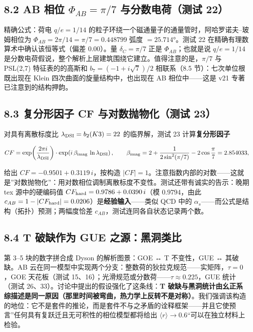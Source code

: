 \documentclass[
]{article}
\begin{document}
\subsection{\texorpdfstring{8.2 AB 相位 \(\Phi_{AB} = \pi/7\)
与分数电荷（测试
22）}{8.2 AB 相位 \textbackslash Phi\_\{AB\} = \textbackslash pi/7 与分数电荷（测试 22）}}\label{ab-ux76f8ux4f4d-phi_ab-pi7-ux4e0eux5206ux6570ux7535ux8377ux6d4bux8bd5-22}

精确公式：荷电 \(q/e = 1/14\)
的粒子环绕一个磁通量子的通量管时，阿哈罗诺夫--玻姆相位为
\(\Phi_{AB} = 2\pi/14 = \pi/7 = 0.448799\) 弧度 \(= 25.714°\)。测试 22
在精确有理数算术中确认该恒等式（偏差 \(0.00\)）。量 \(\delta_C=\pi/7\)
正是 \(\Phi_{AB}\)；也就是说 \(q/e=1/14\)
是分数电荷假说，整个解析上层建筑围绕它建立。值得注意的是，\(\pi/7\) 与
PSL(2,7) 特征表的的高斯和 \(b_7=(-1+i\sqrt7)/2\) 相联系（8.5
节）：七次单位根既出现在 Klein 四次曲面的旋量结构中，也出现在 AB
相位中------这是 v21 专著已注意到的结构押韵。

\subsection{8.3 复分形因子 CF 与对数抛物化（测试
23）}\label{ux590dux5206ux5f62ux56e0ux5b50-cf-ux4e0eux5bf9ux6570ux629bux7269ux5316ux6d4bux8bd5-23}

对具有离散标度比 \(\lambda_{\rm DSI} = b_2(K3) = 22\) 的临界解，测试 23
计算\textbf{复分形因子}

\[CF = \exp\!\left(\frac{2\pi i}{\lambda_{\rm DSI}}\right)\cdot\exp\!\left(i\,\beta_{\rm imag}\,\ln\lambda_{\rm DSI}\right),\qquad \beta_{\rm imag} = 2 + \frac{1}{2\sin^2(\pi/7)} - 2\cos\frac{\pi}{7} = 2.854033,\]

给出 \(CF = -0.9501 + 0.3119\,i\)，按构造
\(|CF| = 1\)。注意指数内部的对数------这就是''对数抛物化''：用对数相位调制离散标度不变性。测试还带有诚实的告示：晚期
tex 源中的硬编码值 \(CF_{\rm hard} = 0.9786 + 0.0390\,i\)（模
\(0.9794\)，由此
\(c_{AB} = 1-|CF_{\rm hard}| = 0.0206\)）是\textbf{经验输入}------类似
QCD 中的 \(\alpha_s\)------而公式是结构（拓扑）预测；两幅度恰差
\(c_{AB}\)，测试连同各自状态记录两个数。

\subsection{8.4 T 破缺作为 GUE
之源：黑洞类比}\label{t-ux7834ux7f3aux4f5cux4e3a-gue-ux4e4bux6e90ux9ed1ux6d1eux7c7bux6bd4}

第 3--5 块的数字拼合成 Dyson 的解析图景：GOE ↔ T 不变性，GUE ↔
其破缺。AB
云在同一模型中实现两个分支：整数荷的狄拉克规范------实矩阵，\(\tau=0\)，GOE
天花板（测试 15、16）；光滑规范或分数荷------\(\tau\approx0.225\)，GUE
统计（测试 26、33）。讨论中提出的假设强化了这条线：\textbf{T
破缺与黑洞统计由幺正系综描述是同一原因（那里时间被弯曲，热力学上反转不是对称）}。我们强调该构造的地位：它不是套件的推论，而是套件不与之矛盾的诠释框架------并且它使预言''任何具有复跃迁且无可积性的相位模型都将给出
\(\langle r\rangle\to0.6\)``可以在独立材料上检验。
\end{document}
